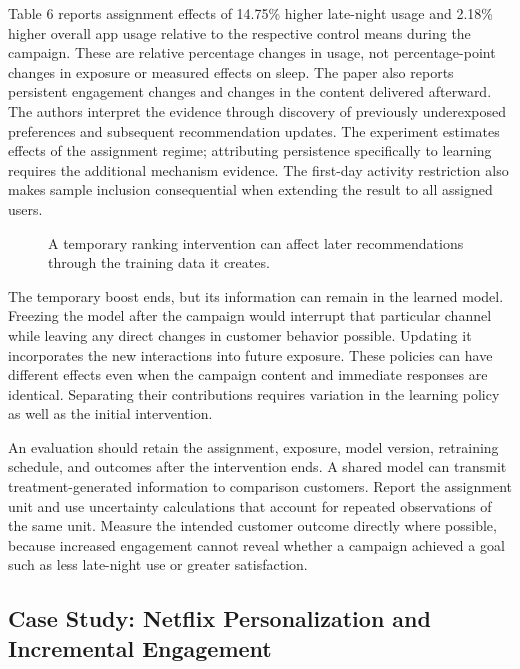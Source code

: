 Table 6 reports assignment effects of 14.75\% higher late-night usage
and 2.18\% higher overall app usage relative to the respective control
means during the campaign. These are relative percentage changes in
usage, not percentage-point changes in exposure or measured effects on
sleep. The paper also reports persistent engagement changes and changes
in the content delivered afterward. The authors interpret the evidence
through discovery of previously underexposed preferences and subsequent
recommendation updates. The experiment estimates effects of the
assignment regime; attributing persistence specifically to learning
requires the additional mechanism evidence. The first-day activity
restriction also makes sample inclusion consequential when extending the
result to all assigned users.

\begin{figure}[htbp]
\centering

\caption{A temporary ranking intervention can affect later recommendations through the training data it creates.}\label{fig:M08_policy_horizon}
\end{figure}

The temporary boost ends, but its information can remain in the learned
model. Freezing the model after the campaign would interrupt that
particular channel while leaving any direct changes in customer behavior
possible. Updating it incorporates the new interactions into future
exposure. These policies can have different effects even when the
campaign content and immediate responses are identical. Separating their
contributions requires variation in the learning policy as well as the
initial intervention.

An evaluation should retain the assignment, exposure, model version,
retraining schedule, and outcomes after the intervention ends. A shared
model can transmit treatment-generated information to comparison
customers. Report the assignment unit and use uncertainty calculations
that account for repeated observations of the same unit. Measure the
intended customer outcome directly where possible, because increased
engagement cannot reveal whether a campaign achieved a goal such as less
late-night use or greater satisfaction.

\hypertarget{M08-case-study-netflix-personalization-and-incremental-engagement}{%
\subsection{Case Study: Netflix Personalization and Incremental
Engagement}\label{M08-case-study-netflix-personalization-and-incremental-engagement}}

